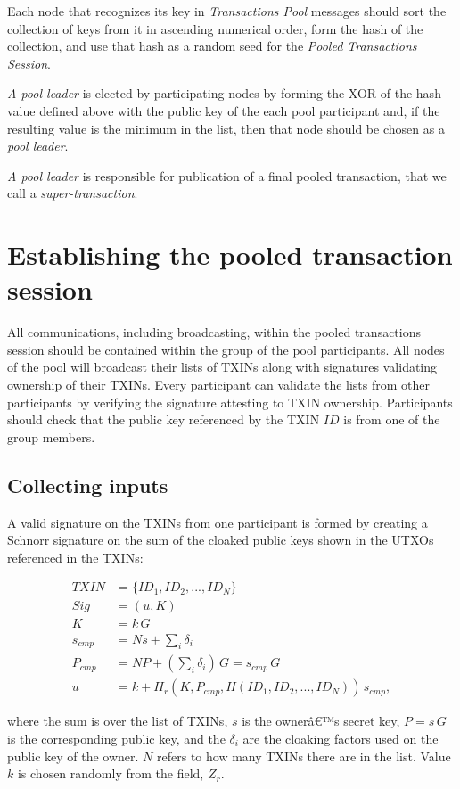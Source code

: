 \documentclass[8pt,fleqn,openany]{book}
\begin{document}
{		Each node that recognizes its key in \textit{Transactions Pool} messages should sort the collection of keys from it in ascending numerical order, form the hash of the collection, and use that hash as a random seed for the \textit{Pooled Transactions Session}.
		
		\textit{A pool leader} is elected by participating nodes by forming the XOR of the hash value defined above with the public key of the each pool participant and, if the resulting value is the minimum in the list, then that node should be chosen as a \textit{pool leader}.
		
		\textit{A pool leader} is responsible for publication of a final pooled transaction, that we call a \textit{super-transaction}.
		
		\section{Establishing the pooled transaction session}
		All communications, including broadcasting, within the pooled transactions session should be contained within the group of the pool participants. All nodes of the pool will broadcast their lists of TXINs along with signatures validating ownership of their TXINs. Every participant can validate the lists from other participants by verifying the signature attesting to TXIN ownership. Participants should check that the public key referenced by the TXIN $ID$ is from one of the group members.
		
		\subsection{Collecting inputs} 
		A valid signature on the TXINs from one participant is formed by creating a Schnorr signature on the sum of the cloaked public keys shown in the UTXOs referenced in the TXINs:
		
		\begin{align*}
		TXIN &= \{ID_1, ID_2, ..., ID_N\}\\
		Sig &= (u, K)\\
		K &= k \, G \\
		s_{cmp} &= N s + \sum_i{\delta_i}\\
		P_{cmp} &= N P + (\sum_i{\delta_i})\, G = s_{cmp} \, G\\
		u &= k + H_r(K, P_{cmp}, H(ID_1, ID_2, ..., ID_N)) \, s_{cmp},
		\end{align*}
		
		where the sum is over the list of TXINs, $s$ is the ownerâ€™s secret key, $P = s \, G$ is the corresponding public key, and the $\delta_i$ are the cloaking factors used on the public key of the owner. $N$ refers to how many TXINs there are in the list. Value $k$ is chosen randomly from the field, $Z_r$. 
		
}
\end{document}
